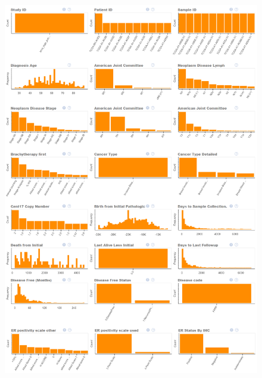 \newpage
\begin{figure}
	\centering
	\includegraphics[width=1
	\linewidth]{NOTEBOOK/IMAGES_EDA/1}
\end{figure}

